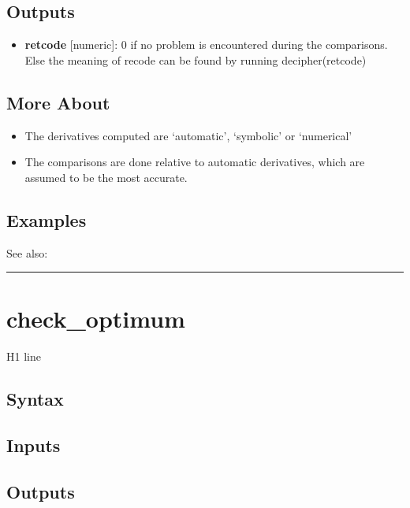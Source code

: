 \documentclass[letterpaper,10pt,english]{sphinxmanual}
\begin{document}
\subsection{Outputs}
\label{classes/models/@dsge/dsge:outputs}\begin{itemize}
\item {} 
\textbf{retcode} {[}numeric{]}: 0 if no problem is encountered during the
comparisons. Else the meaning of recode can be found by running
decipher(retcode)

\end{itemize}


\subsection{More About}
\label{classes/models/@dsge/dsge:more-about}\begin{itemize}
\item {} 
The derivatives computed are `automatic', `symbolic' or `numerical'

\item {} 
The comparisons are done relative to automatic derivatives, which are
assumed to be the most accurate.

\end{itemize}


\subsection{Examples}
\label{classes/models/@dsge/dsge:examples}
See also:


\bigskip\hrule{}\bigskip



\section{check\_optimum}
\label{classes/models/@dsge/dsge:check-optimum}\label{classes/models/@dsge/dsge:id2}
H1 line


\subsection{Syntax}
\label{classes/models/@dsge/dsge:id3}

\subsection{Inputs}
\label{classes/models/@dsge/dsge:id4}

\subsection{Outputs}
\label{classes/models/@dsge/dsge:id5}
\end{document}
